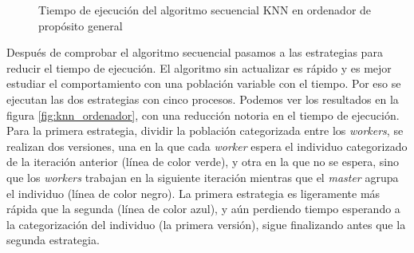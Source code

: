 			\begin{figure}[!h]
				\centering
				\caption{Tiempo de ejecución del algoritmo secuencial KNN en ordenador de propósito general}
				\label{fig:knn_secuencial}
			\end{figure}

			
		
			Después de comprobar el algoritmo secuencial pasamos a las estrategias para reducir el tiempo de ejecución. El algoritmo sin actualizar es rápido y es mejor estudiar el comportamiento con una población variable con el tiempo. Por eso se ejecutan las dos estrategias con cinco procesos. Podemos ver los resultados en la figura \ref{fig:knn_ordenador}, con una reducción notoria en el tiempo de ejecución. Para la primera estrategia, dividir la población categorizada entre los \textit{workers}, se realizan dos versiones, una en la que cada \textit{worker} espera el individuo categorizado de la iteración anterior (línea de color verde), y otra en la que no se espera, sino que los \textit{workers} trabajan en la siguiente iteración mientras que el \textit{master} agrupa el individuo (línea de color negro). La primera estrategia es ligeramente más rápida que la segunda (línea de color azul), y aún perdiendo tiempo esperando a la categorización del individuo (la primera versión), sigue finalizando antes que la segunda estrategia. 
			
